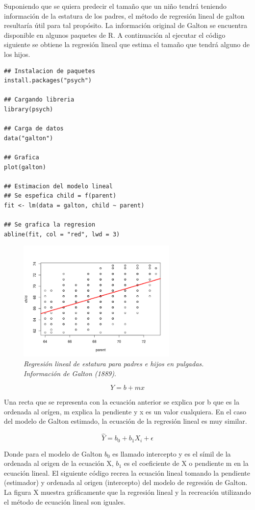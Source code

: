 \documentclass[letterpaper,12pt, spanish, oneside]{book} %
\begin{document}
Suponiendo que se quiera predecir el tamaño que un niño tendrá teniendo información de la estatura de los padres, el método de regresión lineal de galton resultaría útil para tal propósito. La información original de Galton se encuentra disponible en algunos paquetes de R. A continuación al ejecutar el código siguiente se obtiene la regresión lineal que estima el tamaño que tendrá alguno de los hijos.

\begin{lstlisting}
## Instalacion de paquetes
install.packages("psych")

## Cargando libreria
library(psych)

## Carga de datos
data("galton")

## Grafica
plot(galton)

## Estimacion del modelo lineal
## Se espefica child = f(parent)
fit <- lm(data = galton, child ~ parent)

## Se grafica la regresion
abline(fit, col = "red", lwd = 3)
\end{lstlisting}


\begin{figure}[H]
\centering
\includegraphics[width=0.7\textwidth]{galton11.png}
\caption{\label{fig:frog2}\textit{Regresión lineal de estatura para padres e hijos en pulgadas. Información de Galton (1889)}.}
\end{figure}


$$ Y = b + mx$$

Una recta que se representa con la ecuación anterior se explica por b que es la ordenada al orígen, m explica la pendiente y x es un valor cualquiera. En el caso del modelo de Galton estimado, la ecuación de la regresión lineal es muy similar.

$$ \hat{Y} = b_0 + b_1 X_i + \epsilon$$

Donde para el modelo de Galton $b_0$ es llamado intercepto y es el símil de la ordenada al origen de la ecuación X, $b_1$ es el coeficiente de X o pendiente m en la ecuación lineal. El siguiente código recrea la ecuación lineal tomando la pendiente (estimador) y ordenada al origen (intercepto) del modelo de regresión de Galton. La figura X muestra gráficamente que la regresión lineal y la recreación utilizando el método de ecuación lineal son iguales.
\end{document}
